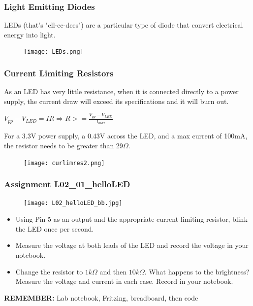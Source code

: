 \documentclass{beamer}
\begin{document}
\begin{frame}
\frametitle{Light Emitting Diodes}
LEDs (that's "ell-ee-dees") are a particular type of diode that convert electrical energy into light.
\begin{figure}	
	\texttt{[image: LEDs.png]}
\end{figure}
\end{frame}

\begin{frame}
\frametitle{Current Limiting Resistors}
As an LED has very little resistance, when it is connected directly to a power supply, the current draw will exceed its specifications and it will burn out. 
\newline

\begin{center}
$
V_{pp} - V_{LED} = IR \Longrightarrow 
R >= \frac{V_{pp} - V_{LED}}{I_{max}}
$
\end{center}

For a 3.3V power supply, a 0.43V across the LED, and a max current of 100mA, the resistor needs to be greater than 29$\Omega$.

\begin{figure}
	\begin{center}	
	\texttt{[image: curlimres2.png]}
	\label{fig:CLR} 
	\end{center}
\end{figure}
\end{frame}



\begin{frame}
\frametitle{Assignment L02\_01\_helloLED}
\begin{figure}
\texttt{[image: L02\_helloLED\_bb.jpg]} 
\end{figure}
\begin{itemize}
\item Using Pin 5 as an output and the appropriate current limiting resistor, blink the LED once per second.
\item Measure the voltage at both leads of the LED and record the voltage in your notebook. 
\item Change the resistor to $1k\Omega$ and then $10k\Omega$. What happens to the brightness? Measure the voltage and current in each case. Record in your notebook.
\end{itemize}
\vspace{0.5cm}
\textbf{REMEMBER:} Lab notebook, Fritzing, breadboard, then code
\end{frame}
\end{document}
